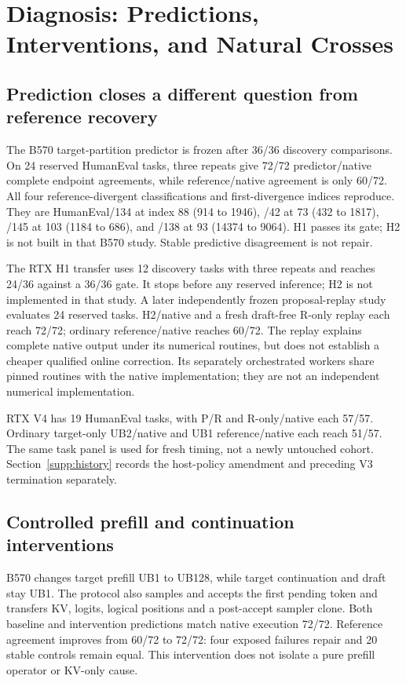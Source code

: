 \section{Diagnosis: Predictions, Interventions, and Natural Crosses}
\label{supp:diagnosis}
\subsection{Prediction closes a different question from reference recovery}
The B570 target-partition predictor is frozen after 36/36 discovery comparisons. On 24 reserved HumanEval tasks, three repeats give 72/72 predictor/native complete endpoint agreements, while reference/native agreement is only 60/72. All four reference-divergent classifications and first-divergence indices reproduce. They are HumanEval/134 at index 88 (914 to 1946), /42 at 73 (432 to 1817), /145 at 103 (1184 to 686), and /138 at 93 (14374 to 9064). H1 passes its gate; H2 is not built in that B570 study. Stable predictive disagreement is not repair.

The RTX H1 transfer uses 12 discovery tasks with three repeats and reaches 24/36 against a 36/36 gate. It stops before any reserved inference; H2 is not implemented in that study. A later independently frozen proposal-replay study evaluates 24 reserved tasks. H2/native and a fresh draft-free R-only replay each reach 72/72; ordinary reference/native reaches 60/72. The replay explains complete native output under its numerical routines, but does not establish a cheaper qualified online correction. Its separately orchestrated workers share pinned routines with the native implementation; they are not an independent numerical implementation.

RTX V4 has 19 HumanEval tasks, with P/R and R-only/native each 57/57. Ordinary target-only UB2/native and UB1 reference/native each reach 51/57. The same task panel is used for fresh timing, not a newly untouched cohort. Section~\ref{supp:history} records the host-policy amendment and preceding V3 termination separately.

\subsection{Controlled prefill and continuation interventions}
B570 changes target prefill UB1 to UB128, while target continuation and draft stay UB1. The protocol also samples and accepts the first pending token and transfers KV, logits, logical positions and a post-accept sampler clone. Both baseline and intervention predictions match native execution 72/72. Reference agreement improves from 60/72 to 72/72: four exposed failures repair and 20 stable controls remain equal. This intervention does not isolate a pure prefill operator or KV-only cause.


